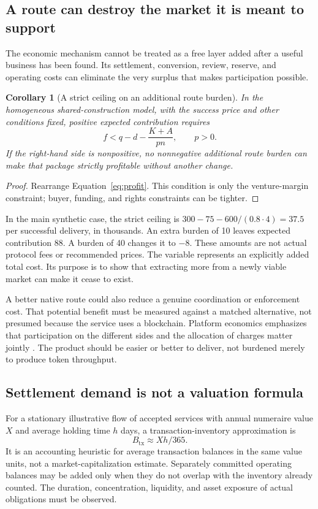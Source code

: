 \documentclass[11pt,letterpaper]{article}
\newtheorem{corollary}{Corollary}[section]
\theoremstyle{remark}\newtheorem{remark}{Remark}[section]
\begin{document}
\subsection{A route can destroy the market it is meant to support}
The economic mechanism cannot be treated as a free layer added after a useful business has been found. Its settlement, conversion, review, reserve, and operating costs can eliminate the very surplus that makes participation possible.

\begin{corollary}[A strict ceiling on an additional route burden]\label{cor:route}
In the homogeneous shared-construction model, with the success price and other conditions fixed, positive expected contribution requires
\begin{equation}\label{eq:fee-cap}
f<q-d-\frac{K+A}{pn},\qquad p>0.
\end{equation}
If the right-hand side is nonpositive, no nonnegative additional route burden can make that package strictly profitable without another change.
\end{corollary}
\begin{proof}
Rearrange Equation~\eqref{eq:profit}. This condition is only the venture-margin constraint; buyer, funding, and rights constraints can be tighter.
\end{proof}

In the main synthetic case, the strict ceiling is $300-75-600/(0.8\cdot4)=37.5$ per successful delivery, in thousands. An extra burden of 10 leaves expected contribution 88. A burden of 40 changes it to $-8$. These amounts are not actual protocol fees or recommended prices. The variable represents an explicitly added total cost. Its purpose is to show that extracting more from a newly viable market can make it cease to exist.

A better native route could also reduce a genuine coordination or enforcement cost. That potential benefit must be measured against a matched alternative, not presumed because the service uses a blockchain. Platform economics emphasizes that participation on the different sides and the allocation of charges matter jointly \citep{rochet2003}. The product should be easier or better to deliver, not burdened merely to produce token throughput.

\subsection{Settlement demand is not a valuation formula}
For a stationary illustrative flow of accepted services with annual numeraire value $X$ and average holding time $h$ days, a transaction-inventory approximation is
\begin{equation}\label{eq:inventory}
B_{\mathrm{tx}}\approx Xh/365.
\end{equation}
It is an accounting heuristic for average transaction balances in the same value units, not a market-capitalization estimate. Separately committed operating balances may be added only when they do not overlap with the inventory already counted. The duration, concentration, liquidity, and asset exposure of actual obligations must be observed.
\end{document}
